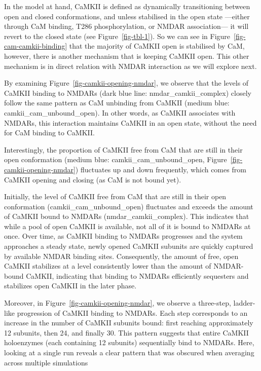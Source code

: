 \documentclass[
  11pt,
  letterpaper,
]{scrreprt}
\begin{document}
In the model at hand, CaMKII is defined as dynamically transitioning
between open and closed conformations, and unless stabilised in the open
state ---either through CaM binding, T286 phosphorylation, or NMDAR
association--- it will revert to the closed state (see
Figure~\ref{fig-tbl-1}). So we can see in
Figure~\ref{fig-cam-camkii-binding} that the majority of CaMKII open is
stabilised by CaM, however, there is another mechanism that is keeping
CaMKII open. This other mechanism is in direct relation with NMDAR
interaction as we will explore next.

By examining Figure~\ref{fig-camkii-opening-nmdar}, we observe that the
levels of CaMKII binding to NMDARs (dark blue line:
nmdar\_camkii\_complex) closely follow the same pattern as CaM unbinding
from CaMKII (medium blue: camkii\_cam\_unbound\_open). In other words,
as CaMKII associates with NMDARs, this interaction maintains CaMKII in
an open state, without the need for CaM binding to CaMKII.

Interestingly, the proportion of CaMKII free from CaM that are still in
their open conformation (medium blue: camkii\_cam\_unbound\_open,
Figure~\ref{fig-camkii-opening-nmdar}) fluctuates up and down
frequently, which comes from CaMKII opening and closing (as CaM is not
bound yet).

Initially, the level of CaMKII free from CaM that are still in their
open conformation (camkii\_cam\_unbound\_open) fluctuates and exceeds
the amount of CaMKII bound to NMDARs (nmdar\_camkii\_complex). This
indicates that while a pool of open CaMKII is available, not all of it
is bound to NMDARs at once. Over time, as CaMKII binding to NMDARs
progresses and the system approaches a steady state, newly opened CaMKII
subunits are quickly captured by available NMDAR binding sites.
Consequently, the amount of free, open CaMKII stabilizes at a level
consistently lower than the amount of NMDAR-bound CaMKII, indicating
that binding to NMDARs efficiently sequesters and stabilizes open CaMKII
in the later phase.

Moreover, in Figure~\ref{fig-camkii-opening-nmdar}, we observe a
three-step, ladder-like progression of CaMKII binding to NMDARs. Each
step corresponds to an increase in the number of CaMKII subunits bound:
first reaching approximately 12 subunits, then 24, and finally 30. This
pattern suggests that entire CaMKII holoenzymes (each containing 12
subunits) sequentially bind to NMDARs. Here, looking at a single run
reveals a clear pattern that was obscured when averaging across multiple
simulations
\end{document}
